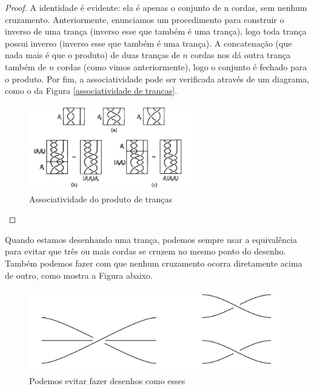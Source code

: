 \documentclass[a4paper,portuguese,11pt,twoside, leqno]{book}
\theoremstyle{definition}
\begin{document}
	\begin{proof}
		A identidade é evidente: ela é apenas o conjunto de n cordas, sem nenhum cruzamento. Anteriormente, enunciamos um procedimento para construir o inverso de uma trança (inverso esse que também é uma trança), logo toda trança possui inverso (inverso esse que também é uma trança). A concatenação (que nada mais é que o produto) de duas tranças de $n$ cordas nos dá outra trança também de $n$ cordas (como vimos anteriormente), logo o conjunto é fechado para o produto. Por fim, a associatividade pode ser verificada através de um diagrama, como o da Figura \eqref{associatividade de trancas}.
		
		\begin{figure}[H]
			\captionsetup{justification=centering}
			\begin{center}
				\includegraphics[width=7.1cm]{associatividade.png}
			\end{center}\caption{Associatividade do produto de tranças}\label{associatividade de trancas}
		\end{figure}
	\end{proof}
	\par\vspace{0.3cm} Quando estamos desenhando uma trança, podemos sempre usar a equivalência para evitar que três ou mais cordas se cruzem no mesmo ponto do desenho. Também podemos fazer com que nenhum cruzamento ocorra diretamente acima de outro, como mostra a Figura abaixo.
	
	\begin{figure}[H]
		\captionsetup{justification=centering}
		\begin{center}
			\includegraphics[width=12cm]{desenhos_evitaveis.png}
		\end{center}\caption{Podemos evitar fazer desenhos como esses}\label{diagramas indesejaveis}
	\end{figure}
	
\end{document}
